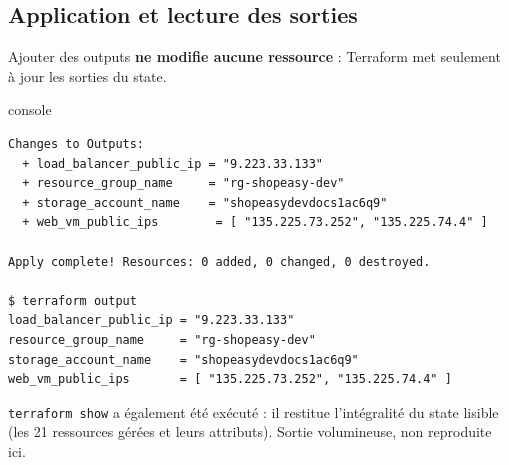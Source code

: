 \documentclass[11pt,a4paper]{article}
\newcommand{\code}[1]{\texttt{#1}}
\begin{document}
\subsection{Application et lecture des sorties}
Ajouter des outputs \textbf{ne modifie aucune ressource} : Terraform met seulement à jour les sorties du state.
\begin{codebox}{console}
\begin{Verbatim}
Changes to Outputs:
  + load_balancer_public_ip = "9.223.33.133"
  + resource_group_name     = "rg-shopeasy-dev"
  + storage_account_name    = "shopeasydevdocs1ac6q9"
  + web_vm_public_ips        = [ "135.225.73.252", "135.225.74.4" ]

Apply complete! Resources: 0 added, 0 changed, 0 destroyed.

$ terraform output
load_balancer_public_ip = "9.223.33.133"
resource_group_name     = "rg-shopeasy-dev"
storage_account_name    = "shopeasydevdocs1ac6q9"
web_vm_public_ips       = [ "135.225.73.252", "135.225.74.4" ]
\end{Verbatim}
\end{codebox}
{\small \code{terraform show} a également été exécuté : il restitue l'intégralité du state lisible (les 21 ressources gérées et leurs attributs). Sortie volumineuse, non reproduite ici.}
\end{document}
